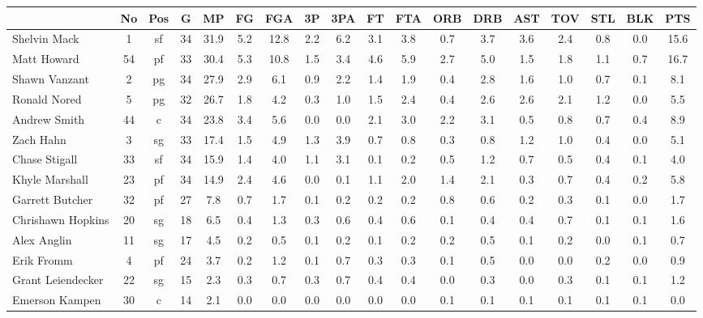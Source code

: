 \documentclass[10pt,letterpaper]{article}
\begin{document}
\begin{table}[ht]
\begin{center}
\begin{tabular}{lccccccccccccccccc}
  \hline
 & No & Pos & G & MP & FG & FGA & 3P & 3PA & FT & FTA & ORB & DRB & AST & TOV & STL & BLK & PTS \\ 
  \hline
Shelvin Mack & 1 & sf & 34 & 31.9 & 5.2 & 12.8 & 2.2 & 6.2 & 3.1 & 3.8 & 0.7 & 3.7 & 3.6 & 2.4 & 0.8 & 0.0 & 15.6 \\ 
  Matt Howard & 54 & pf & 33 & 30.4 & 5.3 & 10.8 & 1.5 & 3.4 & 4.6 & 5.9 & 2.7 & 5.0 & 1.5 & 1.8 & 1.1 & 0.7 & 16.7 \\ 
  Shawn Vanzant & 2 & pg & 34 & 27.9 & 2.9 & 6.1 & 0.9 & 2.2 & 1.4 & 1.9 & 0.4 & 2.8 & 1.6 & 1.0 & 0.7 & 0.1 & 8.1 \\ 
  Ronald Nored & 5 & pg & 32 & 26.7 & 1.8 & 4.2 & 0.3 & 1.0 & 1.5 & 2.4 & 0.4 & 2.6 & 2.6 & 2.1 & 1.2 & 0.0 & 5.5 \\ 
  Andrew Smith & 44 & c & 34 & 23.8 & 3.4 & 5.6 & 0.0 & 0.0 & 2.1 & 3.0 & 2.2 & 3.1 & 0.5 & 0.8 & 0.7 & 0.4 & 8.9 \\ 
  Zach Hahn & 3 & sg & 33 & 17.4 & 1.5 & 4.9 & 1.3 & 3.9 & 0.7 & 0.8 & 0.3 & 0.8 & 1.2 & 1.0 & 0.4 & 0.0 & 5.1 \\ 
  Chase Stigall & 33 & sf & 34 & 15.9 & 1.4 & 4.0 & 1.1 & 3.1 & 0.1 & 0.2 & 0.5 & 1.2 & 0.7 & 0.5 & 0.4 & 0.1 & 4.0 \\ 
  Khyle Marshall & 23 & pf & 34 & 14.9 & 2.4 & 4.6 & 0.0 & 0.1 & 1.1 & 2.0 & 1.4 & 2.1 & 0.3 & 0.7 & 0.4 & 0.2 & 5.8 \\ 
  Garrett Butcher & 32 & pf & 27 & 7.8 & 0.7 & 1.7 & 0.1 & 0.2 & 0.2 & 0.2 & 0.8 & 0.6 & 0.2 & 0.3 & 0.1 & 0.0 & 1.7 \\ 
  Chrishawn Hopkins & 20 & sg & 18 & 6.5 & 0.4 & 1.3 & 0.3 & 0.6 & 0.4 & 0.6 & 0.1 & 0.4 & 0.4 & 0.7 & 0.1 & 0.1 & 1.6 \\ 
  Alex Anglin & 11 & sg & 17 & 4.5 & 0.2 & 0.5 & 0.1 & 0.2 & 0.1 & 0.2 & 0.2 & 0.5 & 0.1 & 0.2 & 0.0 & 0.1 & 0.7 \\ 
  Erik Fromm & 4 & pf & 24 & 3.7 & 0.2 & 1.2 & 0.1 & 0.7 & 0.3 & 0.3 & 0.1 & 0.5 & 0.0 & 0.0 & 0.2 & 0.0 & 0.9 \\ 
  Grant Leiendecker & 22 & sg & 15 & 2.3 & 0.3 & 0.7 & 0.3 & 0.7 & 0.4 & 0.4 & 0.0 & 0.3 & 0.0 & 0.3 & 0.1 & 0.1 & 1.2 \\ 
  Emerson Kampen & 30 & c & 14 & 2.1 & 0.0 & 0.0 & 0.0 & 0.0 & 0.0 & 0.0 & 0.1 & 0.1 & 0.1 & 0.1 & 0.1 & 0.1 & 0.0 \\ 
   \hline
\end{tabular}
\end{center}
\end{table}
\end{document}

